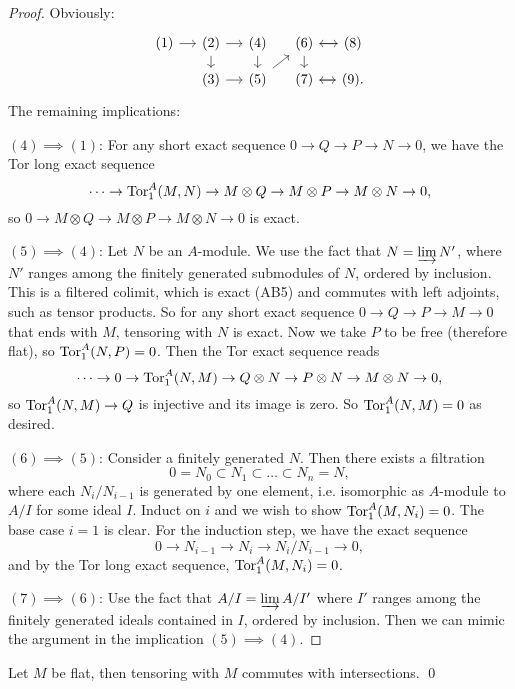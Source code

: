 \documentclass[11pt]{amsart}
\begin{document}
\begin{proof}
    Obviously:
    \[
    \begin{tikzcd}[column sep=small, row sep = small]
        (1) \arrow[r] & (2) \arrow[r] \arrow[d] & (4)  \arrow[d] & (6) \arrow[r] \arrow[d] & (8) \arrow[l] \\
        & (3) \arrow[r] & (5) \arrow[ru] & (7) \arrow[r] & (9). \arrow[l]
    \end{tikzcd}
    \]
    The remaining implications:

    $(4) \implies (1)$: For any short exact sequence $0\to Q\to P\to N\to 0$, we have the Tor long exact sequence
    \[\dots \to \operatorname{Tor}_1^A(M,N) \to M\otimes Q\to M\otimes P\to M\otimes N \to 0,\]
    so $0\to M\otimes Q\to M\otimes P\to M\otimes N \to 0$ is exact.

    $(5) \implies (4)$: Let $N$ be an $A$-module. We use the fact that $N = \varinjlim N'$, where $N'$ ranges among the finitely generated submodules of $N$, ordered by inclusion. This is a filtered colimit, which is exact (AB5) and commutes with left adjoints, such as tensor products. So for any short exact sequence
    $0 \to Q\to P\to M\to 0$ that ends with $M$, tensoring with $N$ is exact. Now we take $P$ to be free (therefore flat), so $\operatorname{Tor}_1^A(N,P) = 0$. Then the Tor exact sequence reads
    \[\dots \to 0\to \operatorname{Tor}_1^A(N,M) \to Q\otimes N \to P\otimes N \to M\otimes N \to 0,\]
    so $\operatorname{Tor}_1^A(N,M) \to Q$ is injective and its image is zero. So $\operatorname{Tor}_1^A(N,M) = 0$ as desired.

    $(6)\implies (5)$: Consider a finitely generated $N$. Then there exists a filtration
    \[0 = N_0 \subset N_1\subset\dots \subset N_n = N,\]
    where each $N_i/N_{i-1}$ is generated by one element, i.e. isomorphic as $A$-module to $A/I$ for some ideal $I$. Induct on $i$ and we wish to show $\operatorname{Tor}_1^A(M,N_i) = 0$. The base case $i = 1$ is clear. For the induction step, we have the exact sequence
    \[0\to N_{i-1} \to N_i \to N_i/N_{i-1} \to 0,\]
    and by the Tor long exact sequence, $\operatorname{Tor}_1^A(M,N_i) = 0$.

    $(7)\implies (6)$: Use the fact that $A/I = \varinjlim A/I'$ where $I'$ ranges among the finitely generated ideals contained in $I$, ordered by inclusion. Then we can mimic the argument in the implication $(5)\implies (4)$.
\end{proof}

\begin{prop}
    Let $M$ be flat, then tensoring with $M$ commutes with intersections. \qed
\end{prop}
\end{document}
